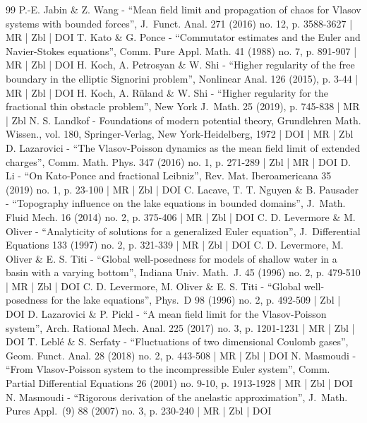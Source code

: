 \begin{thebibliography}{99}
P.-E. Jabin \& Z. Wang - “Mean field limit and propagation of chaos for Vlasov systems with bounded forces”, J. Funct. Anal. 271 (2016) no. 12, p. 3588-3627 | MR | Zbl | DOI
T. Kato \& G. Ponce - “Commutator estimates and the Euler and Navier-Stokes equations”, Comm. Pure Appl. Math. 41 (1988) no. 7, p. 891-907 | MR | Zbl | DOI
H. Koch, A. Petrosyan \& W. Shi - “Higher regularity of the free boundary in the elliptic Signorini problem”, Nonlinear Anal. 126 (2015), p. 3-44 | MR | Zbl | DOI
H. Koch, A. Rüland \& W. Shi - “Higher regularity for the fractional thin obstacle problem”, New York J. Math. 25 (2019), p. 745-838 | MR | Zbl
N. S. Landkof - Foundations of modern potential theory, Grundlehren Math. Wissen., vol. 180, Springer-Verlag, New York-Heidelberg, 1972 | DOI | MR | Zbl
D. Lazarovici - “The Vlasov-Poisson dynamics as the mean field limit of extended charges”, Comm. Math. Phys. 347 (2016) no. 1, p. 271-289 | Zbl | MR | DOI
D. Li - “On Kato-Ponce and fractional Leibniz”, Rev. Mat. Iberoamericana 35 (2019) no. 1, p. 23-100 | MR | Zbl | DOI
C. Lacave, T. T. Nguyen \& B. Pausader - “Topography influence on the lake equations in bounded domains”, J. Math. Fluid Mech. 16 (2014) no. 2, p. 375-406 | MR | Zbl | DOI
C. D. Levermore \& M. Oliver - “Analyticity of solutions for a generalized Euler equation”, J. Differential Equations 133 (1997) no. 2, p. 321-339 | MR | Zbl | DOI
C. D. Levermore, M. Oliver \& E. S. Titi - “Global well-posedness for models of shallow water in a basin with a varying bottom”, Indiana Univ. Math. J. 45 (1996) no. 2, p. 479-510 | MR | Zbl | DOI
C. D. Levermore, M. Oliver \& E. S. Titi - “Global well-posedness for the lake equations”, Phys. D 98 (1996) no. 2, p. 492-509 | Zbl | DOI
D. Lazarovici \& P. Pickl - “A mean field limit for the Vlasov-Poisson system”, Arch. Rational Mech. Anal. 225 (2017) no. 3, p. 1201-1231 | MR | Zbl | DOI
T. Leblé \& S. Serfaty - “Fluctuations of two dimensional Coulomb gases”, Geom. Funct. Anal. 28 (2018) no. 2, p. 443-508 | MR | Zbl | DOI
N. Masmoudi - “From Vlasov-Poisson system to the incompressible Euler system”, Comm. Partial Differential Equations 26 (2001) no. 9-10, p. 1913-1928 | MR | Zbl | DOI
N. Masmoudi - “Rigorous derivation of the anelastic approximation”, J. Math. Pures Appl. (9) 88 (2007) no. 3, p. 230-240 | MR | Zbl | DOI

\end{thebibliography}
